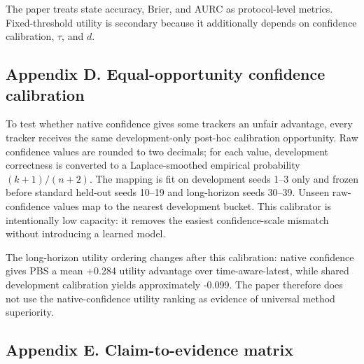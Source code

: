 \documentclass[
  10pt,
  letterpaper,
]{article}
\begin{document}
The paper treats state accuracy, Brier, and AURC as protocol-level
metrics. Fixed-threshold utility is secondary because it additionally
depends on confidence calibration, \(\tau\), and \(d\).

\subsection{Appendix D. Equal-opportunity confidence
calibration}\label{appendix-d.-equal-opportunity-confidence-calibration}

To test whether native confidence gives some trackers an unfair
advantage, every tracker receives the same development-only post-hoc
calibration opportunity. Raw confidence values are rounded to two
decimals; for each value, development correctness is converted to a
Laplace-smoothed empirical probability \((k+1)/(n+2)\). The mapping is
fit on development seeds 1--3 only and frozen before standard held-out
seeds 10--19 and long-horizon seeds 30--39. Unseen raw-confidence values
map to the nearest development bucket. This calibrator is intentionally
low capacity: it removes the easiest confidence-scale mismatch without
introducing a learned model.

The long-horizon utility ordering changes after this calibration: native
confidence gives PBS a mean +0.284 utility advantage over
time-aware-latest, while shared development calibration yields
approximately -0.099. The paper therefore does not use the
native-confidence utility ranking as evidence of universal method
superiority.

\subsection{Appendix E. Claim-to-evidence
matrix}\label{appendix-e.-claim-to-evidence-matrix}
\end{document}
